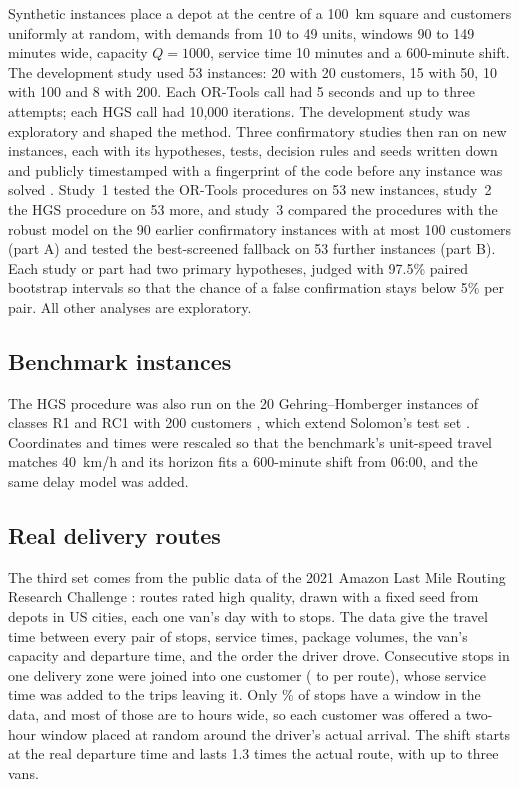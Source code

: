\documentclass[11pt,a4paper]{article}
\theoremstyle{remark}
\begin{document}
Synthetic instances place a depot at the centre of a 100~km square and customers
uniformly at random, with demands from 10 to 49 units, windows 90 to 149 minutes
wide, capacity $Q=1000$, service time 10 minutes and a 600-minute shift. The
development study used 53 instances: 20 with 20 customers, 15 with 50, 10 with 100
and 8 with 200. Each OR-Tools call had 5 seconds and up to three attempts; each HGS
call had 10{,}000 iterations. The development study was exploratory and shaped the
method. Three confirmatory studies then ran on new instances, each with its
hypotheses, tests, decision rules and seeds written down and publicly timestamped
with a fingerprint of the code before any instance was solved
\citep{ali2026freeze,ali2026freeze2,ali2026freeze3}. Study~1 tested the OR-Tools
procedures on 53 new instances, study~2 the HGS procedure on 53 more, and study~3
compared the procedures with the robust model on the 90 earlier confirmatory
instances with at most 100 customers (part A) and tested the best-screened fallback
on 53 further instances (part B). Each study or part had two primary hypotheses,
judged with 97.5\% paired bootstrap intervals so that the chance of a false
confirmation stays below 5\% per pair. All other analyses are exploratory.

\subsection{Benchmark instances}

The HGS procedure was also run on the 20 Gehring--Homberger instances of classes R1
and RC1 with 200 customers \citep{gehring1999}, which extend Solomon's test set
\citep{solomon1987}. Coordinates and times were rescaled so that the benchmark's
unit-speed travel matches 40~km/h and its horizon fits a 600-minute shift from
06:00, and the same delay model was added.

\subsection{Real delivery routes}\label{sec:amazon-design}

The third set comes from the public data of the 2021 Amazon Last Mile Routing
Research Challenge \citep{merchan2022}: \AmzRoutes{} routes rated high quality, drawn
with a fixed seed from \AmzStations{} depots in \AmzCities{} US cities, each one van's day
with \AmzStopsMin{} to \AmzStopsMax{} stops. The data give the travel time between every
pair of stops, service times, package volumes, the van's capacity and departure time,
and the order the driver drove. Consecutive stops in one delivery zone were joined into
one customer (\AmzCustMin{} to \AmzCustMax{} per route), whose service time was added to
the trips leaving it. Only \AmzWindowShare\% of stops have a window in the data, and
most of those are \AmzWindowLo{} to \AmzWindowHi{} hours wide, so each customer was
offered a two-hour window placed at random around the driver's actual arrival. The
shift starts at the real departure time and lasts 1.3 times the actual route, with up to
three vans.
\end{document}
